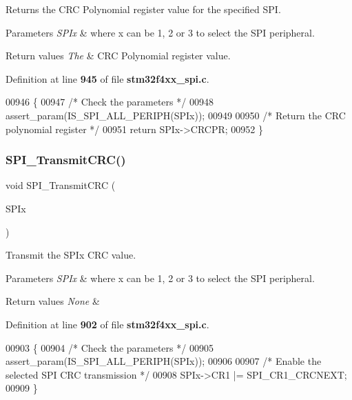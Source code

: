 Returns the C\+RC Polynomial register value for the specified S\+PI. 


\begin{DoxyParams}{Parameters}
{\em S\+P\+Ix} & where x can be 1, 2 or 3 to select the S\+PI peripheral. \\
\hline
\end{DoxyParams}

\begin{DoxyRetVals}{Return values}
{\em The} & C\+RC Polynomial register value. \\
\hline
\end{DoxyRetVals}


Definition at line \textbf{ 945} of file \textbf{ stm32f4xx\+\_\+spi.\+c}.


\begin{DoxyCode}
00946 \{
00947   \textcolor{comment}{/* Check the parameters */}
00948   assert_param(IS_SPI_ALL_PERIPH(SPIx));
00949   
00950   \textcolor{comment}{/* Return the CRC polynomial register */}
00951   \textcolor{keywordflow}{return} SPIx->CRCPR;
00952 \}
\end{DoxyCode}
\mbox{\label{group__SPI__Group3_gace8b1058e09bab150b0dbe5978810273}} 
\subsubsection{S\+P\+I\+\_\+\+Transmit\+C\+R\+C()}
{\footnotesize\ttfamily void S\+P\+I\+\_\+\+Transmit\+C\+RC (\begin{DoxyParamCaption}\item[{\textbf{ S\+P\+I\+\_\+\+Type\+Def} $\ast$}]{S\+P\+Ix }\end{DoxyParamCaption})}



Transmit the S\+P\+Ix C\+RC value. 


\begin{DoxyParams}{Parameters}
{\em S\+P\+Ix} & where x can be 1, 2 or 3 to select the S\+PI peripheral. \\
\hline
\end{DoxyParams}

\begin{DoxyRetVals}{Return values}
{\em None} & \\
\hline
\end{DoxyRetVals}


Definition at line \textbf{ 902} of file \textbf{ stm32f4xx\+\_\+spi.\+c}.


\begin{DoxyCode}
00903 \{
00904   \textcolor{comment}{/* Check the parameters */}
00905   assert_param(IS_SPI_ALL_PERIPH(SPIx));
00906   
00907   \textcolor{comment}{/* Enable the selected SPI CRC transmission */}
00908   SPIx->CR1 |= SPI_CR1_CRCNEXT;
00909 \}
\end{DoxyCode}
